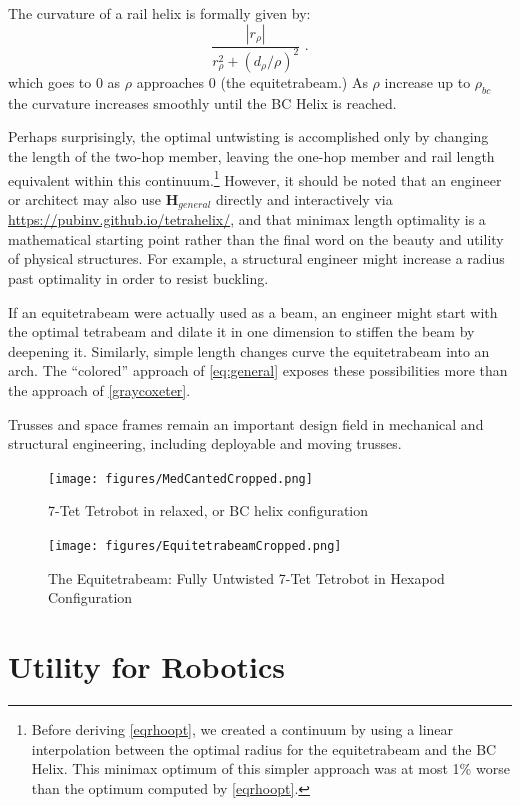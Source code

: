 \documentclass[twocolumn,10pt]{asme2ej}
\renewcommand{\vec}[1]{\mathbf{#1}}
\begin{document}
The curvature of a rail helix is formally given by:
\begin{equation}
  \frac{|r_{\rho}|}{r_{\rho}^2 + (d_{\rho}/\rho)^2} \text{ .}
\end{equation}
which goes to $0$ as $\rho$ approaches $0$ (the equitetrabeam.)
As $\rho$ increase up to $\rho_{bc}$ the curvature increases smoothly until the BC Helix is reached.

Perhaps surprisingly, the optimal untwisting is accomplished only by
changing the length of the two-hop member, leaving the one-hop member
and rail length equivalent within this continuum.\footnote{Before
deriving  \cref{eqrhoopt}, we created a continuum by
using a linear interpolation between the optimal radius for the
equitetrabeam and the BC Helix. This minimax optimum of this simpler
approach was at most 1\% worse than the optimum computed by
\cref{eqrhoopt}.}
 However, it should
be noted that an engineer or architect may also use $\vec{H}_{general}$ 
directly and interactively via \url{https://pubinv.github.io/tetrahelix/},
and that minimax length optimality is a
mathematical starting point rather than the final word on the beauty and utility of
physical structures. For example, a structural engineer might increase a
radius past optimality in order to resist buckling.

If an equitetrabeam were actually
used as a beam, an engineer might start with the optimal tetrabeam and
dilate it in one dimension to stiffen the beam by deepening it. Similarly, simple
length changes curve the equitetrabeam into an arch.
The ``colored'' approach of  \cref{eq:general} exposes these possibilities
more than the approach of  \cref{graycoxeter}.

Trusses and space frames remain an important design field in
mechanical and structural engineering\cite{mikulas1985sequentially},
including deployable and moving trusses\cite{claypool2012readily}.

\begin{figure}
  \centering
     \texttt{[image: figures/MedCantedCropped.png]}
     \caption{7-Tet Tetrobot in relaxed, or BC helix configuration}
     \texttt{[image: figures/EquitetrabeamCropped.png]}
     \caption{The Equitetrabeam: Fully Untwisted 7-Tet Tetrobot in Hexapod Configuration}
     \label{fig:tetrobot}
\end{figure}

\section{Utility for Robotics}
\end{document}
